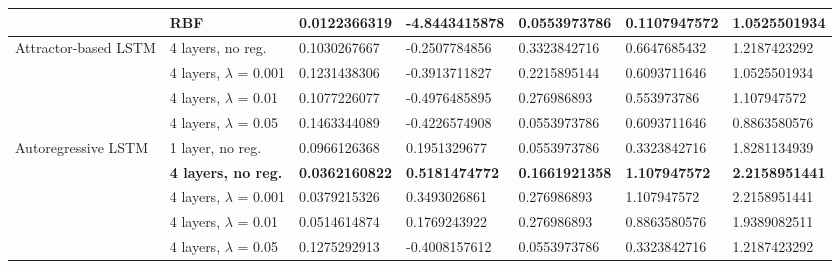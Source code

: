 \documentclass[pdftex,10pt,a4paper,journal]{article}
\theoremstyle{definition}
\theoremstyle{remark}
\begin{document}
{\begin{landscape}
\begin{tabular}{|l|l|l|l|l|l|l|}
                                      & RBF                         & 0.0122366319          & -4.8443415878         & 0.0553973786          & 0.1107947572          & 1.0525501934           \\ \hline
\multirow{4}{*}{Attractor-based LSTM} & 4 layers, no reg.           & 0.1030267667          & -0.2507784856         & 0.3323842716          & 0.6647685432          & 1.2187423292           \\ \cline{2-7} 
                                      & 4 layers, $\lambda$ = 0.001 & 0.1231438306          & -0.3913711827         & 0.2215895144          & 0.6093711646          & 1.0525501934           \\ \cline{2-7} 
                                      & 4 layers, $\lambda$ = 0.01  & 0.1077226077          & -0.4976485895         & 0.276986893           & 0.553973786           & 1.107947572            \\ \cline{2-7} 
                                      & 4 layers, $\lambda$ = 0.05  & 0.1463344089          & -0.4226574908         & 0.0553973786          & 0.6093711646          & 0.8863580576           \\ \hline
\multirow{5}{*}{Autoregressive LSTM}  & 1 layer, no reg.            & 0.0966126368          & 0.1951329677          & 0.0553973786          & 0.3323842716          & 1.8281134939           \\ \cline{2-7} 
                                      & \textbf{4 layers, no reg.}  & \textbf{0.0362160822} & \textbf{0.5181474772} & \textbf{0.1661921358} & \textbf{1.107947572}  & \textbf{2.2158951441}  \\ \cline{2-7} 
                                      & 4 layers, $\lambda$ = 0.001 & 0.0379215326          & 0.3493026861          & 0.276986893           & 1.107947572           & 2.2158951441           \\ \cline{2-7} 
                                      & 4 layers, $\lambda$ = 0.01  & 0.0514614874          & 0.1769243922          & 0.276986893           & 0.8863580576          & 1.9389082511           \\ \cline{2-7} 
                                      & 4 layers, $\lambda$ = 0.05  & 0.1275292913          & -0.4008157612         & 0.0553973786          & 0.3323842716          & 1.2187423292           \\ \hline
\end{tabular}
\label{tab:mg}


\end{landscape}}
\end{document}
